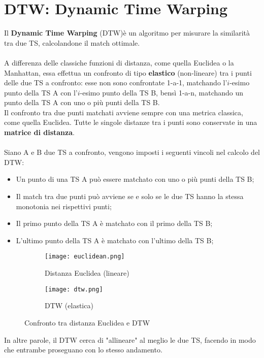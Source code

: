 \section{DTW: Dynamic Time Warping}
Il \textbf{Dynamic Time Warping} (DTW)\cite{dtw}è un algoritmo per misurare la similarità tra due TS, calcolandone il match ottimale.\\
\\
A differenza delle classiche funzioni di distanza, come quella Euclidea o la Manhattan, essa effettua un confronto di tipo \textbf{elastico} (non-lineare) tra i punti delle due TS a confronto: esse non sono confrontate 1-a-1, matchando l'$i$-esimo punto della TS A con l'$i$-esimo punto della TS B, bensì 1-a-n, matchando un punto della TS A con uno o più punti della TS B.\\
Il confronto tra due punti matchati avviene sempre con una metrica classica, come quella Euclidea. Tutte le singole distanze tra i punti sono conservate in una \textbf{matrice di distanza}.\\
\\
Siano A e B due TS a confronto, vengono imposti i seguenti vincoli nel calcolo del DTW:
\begin{itemize}
	\item Un punto di una TS A può essere matchato con uno o più punti della TS B;
	\item Il match tra due punti può avviene se e solo se le due TS hanno la stessa monotonia nei rispettivi punti;
	\item Il primo punto della TS A è matchato con il primo della TS B;
	\item L'ultimo punto della TS A è matchato con l'ultimo della TS B; 
\end{itemize}
\begin{figure}[H]
	\centering
	\begin{subfigure}{.5\textwidth}
		\centering
		\texttt{[image: euclidean.png]}
		\caption{Distanza Euclidea (lineare)}
		\label{fig:distance_euclidean}
	\end{subfigure}%
	\begin{subfigure}{.5\textwidth}
		\centering
		\texttt{[image: dtw.png]}
		\caption{DTW (elastica)}
		\label{fig:distance_dtw}
	\end{subfigure}
	\caption{Confronto tra distanza Euclidea e DTW}
	\label{fig:distance}
\end{figure}
In altre parole, il DTW cerca di "allineare" al meglio le due TS, facendo in modo che entrambe proseguano con lo stesso andamento.\\
